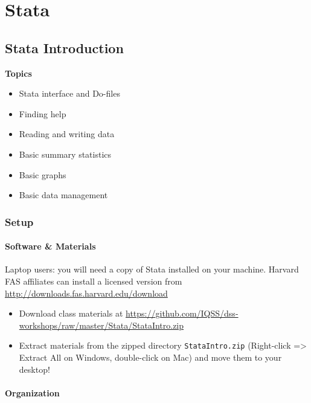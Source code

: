 \documentclass[]{book}
\providecommand{\tightlist}{%
  \setlength{\itemsep}{0pt}\setlength{\parskip}{0pt}}
\begin{document}
\hypertarget{part-stata}{%
\part{Stata}\label{part-stata}}

\hypertarget{stata-introduction}{%
\chapter{Stata Introduction}\label{stata-introduction}}

\textbf{Topics}

\begin{itemize}
\tightlist
\item
  Stata interface and Do-files
\item
  Finding help
\item
  Reading and writing data
\item
  Basic summary statistics
\item
  Basic graphs
\item
  Basic data management
\end{itemize}

\hypertarget{setup-6}{%
\section{Setup}\label{setup-6}}

\hypertarget{software-materials}{%
\subsection{Software \& Materials}\label{software-materials}}

Laptop users: you will need a copy of Stata installed on your machine.
Harvard FAS affiliates can install a licensed version from \url{http://downloads.fas.harvard.edu/download}

\begin{itemize}
\tightlist
\item
  Download class materials at \url{https://github.com/IQSS/dss-workshops/raw/master/Stata/StataIntro.zip}
\item
  Extract materials from the zipped directory \texttt{StataIntro.zip} (Right-click =\textgreater{} Extract All on Windows, double-click on Mac) and move them to your desktop!
\end{itemize}

\hypertarget{organization}{%
\subsection{Organization}\label{organization}}
\end{document}
